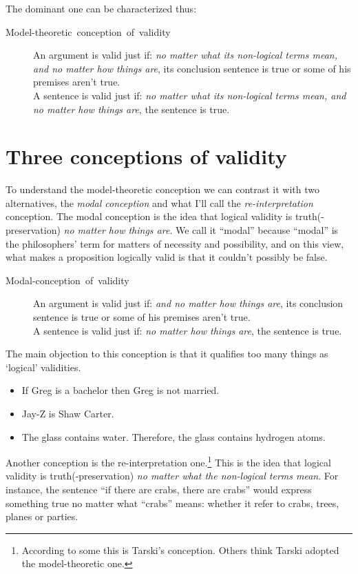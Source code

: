 \documentclass[../../../include/open-logic-part]{subfiles}
\begin{document}
The dominant one can be characterized thus: 

\begin{description} \item
[{Model-theoretic~conception~of~validity}] An argument is valid just
if: \emph{no matter what its non-logical terms mean, and no matter how
things are}, its conclusion sentence is true or some of his premises
aren't true. \\ A sentence is valid just if: \emph{no matter what its
non-logical terms mean, and no matter how things are}, the sentence is
true.  \end{description}

\section{Three conceptions of validity}

To understand the model-theoretic conception we can contrast it with
two alternatives, the \emph{modal conception} and what I'll call the
\emph{re-interpretation} conception. The modal conception is the idea
that logical validity is truth(-preservation) \emph{no matter how
things are}. We call it ``modal'' because ``modal'' is the
philosophers' term for matters of necessity and possibility, and on
this view, what makes a proposition logically valid is that it
couldn't possibly be false.

\begin{description} \item [{Modal-conception~of~validity}] An argument
is valid just if: \emph{and no matter how things are}, its conclusion
sentence is true or some of his premises aren't true. \\ A sentence is
valid just if: \emph{no matter how things are}, the sentence is true. 
\end{description}

The main objection to this conception is that it qualifies too many
things as `logical' validities. 

\begin{itemize} 
	\item If Greg is a bachelor then Greg is not married.
	\item Jay-Z is Shaw Carter. 
	\item The glass contains water. Therefore, the glass contains 
	hydrogen atoms. \end{itemize}

Another conception is the re-interpretation one.\footnote{According to
some this is Tarski's conception. Others think Tarski adopted the
model-theoretic one.} This is the idea that logical validity is
truth(-preservation) \emph{no matter what the non-logical terms mean}.
For instance, the sentence ``if there are crabs, there are crabs''
would express something true no matter what ``crabs'' means: whether
it refer to crabs, trees, planes or parties. 
\end{document}
